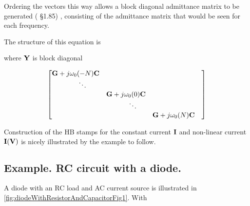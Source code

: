 Ordering the vectors this way allows a block diagonal admittance matrix to be generated (\citep{giannini2004NonlinearMicrowaveCircuitDesign}
 \S 1.85)
, consisting of the admittance matrix that would be seen for each frequency.

The structure of this equation is


where \( \mathbf{Y} \) is block diagonal

\begin{equation}\label{eqn:ece1254projectReport:1360}
\small{
\begin{bmatrix}
\BG + j \omega_0 (-N) \BC &        &                                   & \\
                            \qquad\ddots &                                   & \\
                                   &  \BG + j \omega_0 (0) \BC         & \\
                                   &                            \qquad\ddots & \\
                                   &                                   & \BG + j \omega_0 (N) \BC
\end{bmatrix}
}
\end{equation}

Construction of the HB stamps for the constant current \( \mathbf{I} \) and non-linear current \( \mathbf{I}(\mathbf{V}) \) is nicely illustrated by the example to follow.

\subsection{Example.  RC circuit with a diode.}


A diode with an RC load and AC current source is illustrated in
\cref{fig:diodeWithResistorAndCapacitorFig1}.
With


